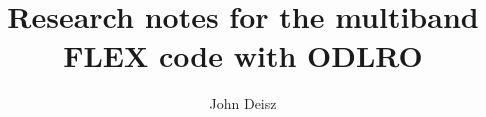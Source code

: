\documentclass[12pt]{book}
\begin{document}
\title{Research notes for the multiband FLEX code with ODLRO}
\author{John Deisz}
\maketitle

\parskip=0pt
\tableofcontents
\parskip=14pt










\appendix






\end{document}
